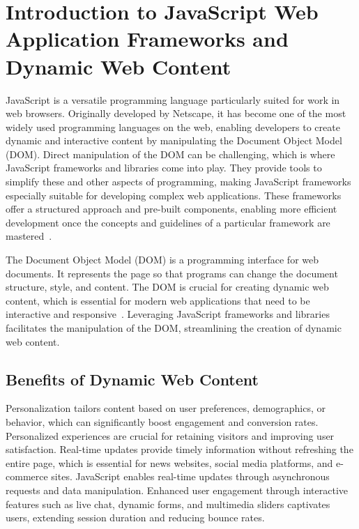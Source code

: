 \section{Introduction to JavaScript Web Application Frameworks and Dynamic Web Content}

JavaScript is a versatile programming language particularly suited for work in web browsers. Originally developed by Netscape, it has become one of the most widely used programming languages on the web, enabling developers to create dynamic and interactive content by manipulating the Document Object Model (DOM). Direct manipulation of the DOM can be challenging, which is where JavaScript frameworks and libraries come into play. They provide tools to simplify these and other aspects of programming, making JavaScript frameworks especially suitable for developing complex web applications. These frameworks offer a structured approach and pre-built components, enabling more efficient development once the concepts and guidelines of a particular framework are mastered~\cite{ionos_jsframeworks}.

The Document Object Model (DOM) is a programming interface for web documents. It represents the page so that programs can change the document structure, style, and content. The DOM is crucial for creating dynamic web content, which is essential for modern web applications that need to be interactive and responsive~\cite{mdn_dom}. Leveraging JavaScript frameworks and libraries facilitates the manipulation of the DOM, streamlining the creation of dynamic web content.

\subsection{Benefits of Dynamic Web Content}

Personalization tailors content based on user preferences, demographics, or behavior, which can significantly boost engagement and conversion rates. Personalized experiences are crucial for retaining visitors and improving user satisfaction. Real-time updates provide timely information without refreshing the entire page, which is essential for news websites, social media platforms, and e-commerce sites. JavaScript enables real-time updates through asynchronous requests and data manipulation. Enhanced user engagement through interactive features such as live chat, dynamic forms, and multimedia sliders captivates users, extending session duration and reducing bounce rates.

